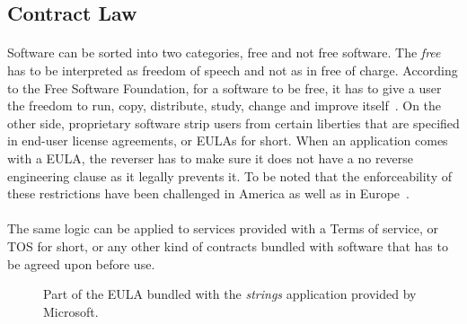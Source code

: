 \subsection{Contract Law}
\paragraph{}
Software can be sorted into two categories, free and not free software. The \textit{free} has to be interpreted as freedom of speech and not as in free of charge. According to the Free Software Foundation, for a software to be free, it has to give a user the freedom to run, copy, distribute, study, change and improve itself~\cite{stallman2002free}. On the other side, proprietary software strip users from certain liberties that are specified in end-user license agreements, or EULAs for short. When an application comes with a EULA, the reverser has to make sure it does not have a no reverse engineering clause as it legally prevents it. To be noted that the enforceability of these restrictions have been challenged in America as well as in Europe~\cite{samuelson2002law}. 

\paragraph{}
The same logic can be applied to services provided with a Terms of service, or TOS for short, or any other kind of contracts bundled with software that has to be agreed upon before use.

\begin{figure}[!htb]
	\centering
	\caption{Part of the EULA bundled with the \textit{strings} application provided by Microsoft.}
	\label{fig:strings_eula}
\end{figure}


